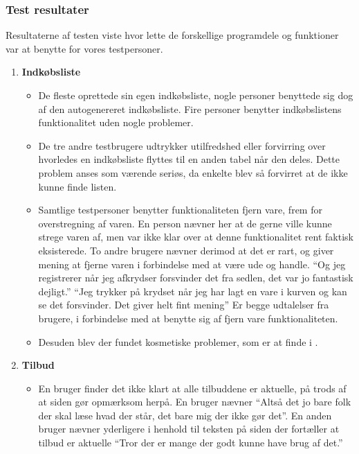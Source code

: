 \subsubsection{Test resultater}\label{ss:bt2}
Resultaterne af testen viste hvor lette de forskellige programdele og funktioner var at benytte for vores testpersoner.
\begin{enumerate}
   \item \textbf{Indkøbsliste}
   \begin{itemize}
      \item De fleste oprettede sin egen indkøbsliste, nogle personer benyttede sig dog af den autogenereret indkøbsliste. 
      Fire personer benytter indkøbslistens funktionalitet uden nogle problemer.
      \item De tre andre testbrugere udtrykker utilfredshed eller forvirring over hvorledes en indkøbsliste flyttes til en anden tabel når den deles.
      Dette problem anses som værende seriøs, da enkelte blev så forvirret at de ikke kunne finde listen. 
      \item Samtlige testpersoner benytter funktionaliteten fjern vare, frem for overstregning af varen. 
      En person nævner her at de gerne ville kunne strege varen af, men var ikke klar over at denne funktionalitet rent faktisk eksisterede.
      To andre brugere nævner derimod at det er rart, og giver mening at fjerne varen i forbindelse med at være ude og handle.
      ``Og jeg registrerer når jeg afkrydser forsvinder det fra sedlen, det var jo fantastisk dejligt.''
      ``Jeg trykker på krydset når jeg har lagt en vare i kurven og kan se det forsvinder. Det giver helt fint mening''
      Er begge udtalelser fra brugere, i forbindelse med at benytte sig af fjern vare funktionaliteten.
      \item Desuden blev der fundet kosmetiske problemer, som er at finde i .
   \end{itemize}
   \item \textbf{Tilbud}
   \begin{itemize}
      \item En bruger finder det ikke klart at alle tilbuddene er aktuelle, på trods af at siden gør opmærksom herpå.
      En bruger nævner ``Altså det jo bare folk der skal læse hvad der står, det bare mig der ikke gør det''.
      En anden bruger nævner yderligere i henhold til teksten på siden der fortæller at tilbud er aktuelle ``Tror der er mange der godt kunne have brug af det.''

\end{itemize}
\end{enumerate}
